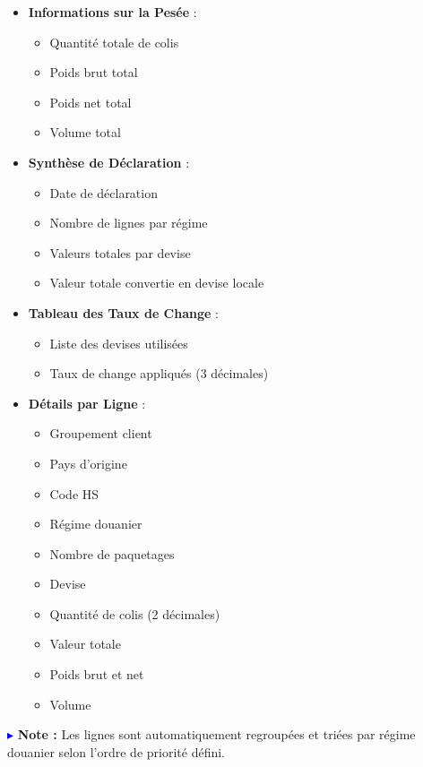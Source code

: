 \documentclass[12pt,a4paper]{report}
\begin{document}
\begin{itemize}[leftmargin=*]
    \item \textbf{Informations sur la Pesée} :
    \begin{itemize}
        \item Quantité totale de colis
        \item Poids brut total
        \item Poids net total
        \item Volume total
    \end{itemize}
    \item \textbf{Synthèse de Déclaration} :
    \begin{itemize}
        \item Date de déclaration
        \item Nombre de lignes par régime
        \item Valeurs totales par devise
        \item Valeur totale convertie en devise locale
    \end{itemize}
    \item \textbf{Tableau des Taux de Change} :
    \begin{itemize}
        \item Liste des devises utilisées
        \item Taux de change appliqués (3 décimales)
    \end{itemize}
    \item \textbf{Détails par Ligne} :
    \begin{itemize}
        \item Groupement client
        \item Pays d'origine
        \item Code HS
        \item Régime douanier
        \item Nombre de paquetages
        \item Devise
        \item Quantité de colis (2 décimales)
        \item Valeur totale
        \item Poids brut et net
        \item Volume
    \end{itemize}
\end{itemize}

\textcolor{blue}{$\blacktriangleright$} \textbf{Note :} Les lignes sont automatiquement regroupées et triées par régime douanier selon l'ordre de priorité défini.
\end{document}
